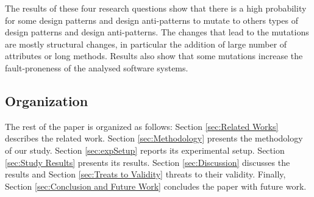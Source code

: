 The results of these four research questions show that there is a high probability for some design patterns and design anti-patterns to mutate to others types of design patterns and design anti-patterns. The changes that lead to the mutations are mostly structural changes, in particular the addition of large number of attributes or long methods. Results also show that some mutations increase the fault-proneness of the analysed software systems.



\subsection{Organization}

The rest of the paper is organized as follows: Section \ref{sec:Related Works} describes the related work. Section \ref{sec:Methodology} presents the methodology of our study. Section \ref{sec:expSetup} reports its experimental setup. Section \ref{sec:Study Results} presents its results. Section \ref{sec:Discussion} discusses the results and Section \ref{sec:Treats to Validity} threats to their validity. Finally, Section \ref{sec:Conclusion and Future Work} concludes the paper with future work.